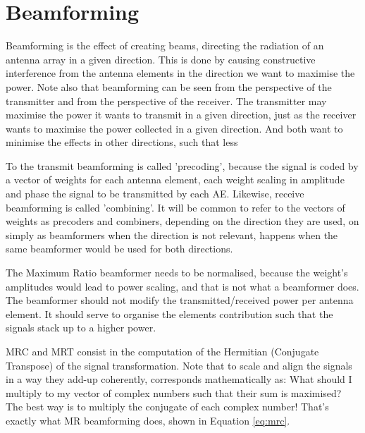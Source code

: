 \label{ap:b}

\section{Beamforming}
Beamforming is the effect of creating beams, directing the radiation of an antenna array in a given direction. This is done by causing constructive interference from the antenna elements in the direction we want to maximise the power. Note also that beamforming can be seen from the perspective of the transmitter and from the perspective of the receiver. The transmitter may maximise the power it wants to transmit in a given direction, just as the receiver wants to maximise the power collected in a given direction. And both want to minimise the effects in other directions, such that less 

To the transmit beamforming is called 'precoding', because the signal is coded by a vector of weights for each antenna element, each weight scaling in amplitude and phase the signal to be transmitted by each AE. Likewise, receive beamforming is called 'combining'. It will be common to refer to the vectors of weights as precoders and combiners, depending on the direction they are used, on simply as beamformers when the direction is not relevant, happens when the same beamformer would be used for both directions.







The Maximum Ratio beamformer \cite{795811} needs to be normalised, because the weight's amplitudes would lead to power scaling, and that is not what a beamformer does. The beamformer should not modify the transmitted/received power per antenna element. It should serve to organise the elements contribution such that the signals stack up to a higher power.


MRC and MRT consist in the computation of the Hermitian (Conjugate Transpose) of the signal transformation. Note that to scale and align the signals in a way they add-up coherently, corresponds mathematically as: What should I multiply to my vector of complex numbers such that their sum is maximised? The best way is to multiply the conjugate of each complex number! That's exactly what MR beamforming does, shown in Equation \eqref{eq:mrc}.

